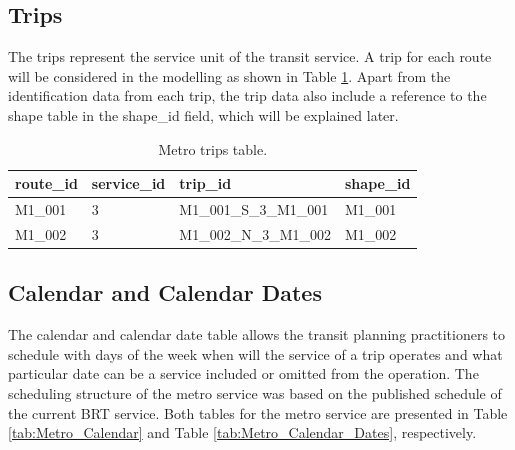 \documentclass[12pt, a4paper]{report}
\begin{document}
\subsection{Trips}

The trips represent the service unit of the transit service. A trip for each route will be considered in the modelling as shown in Table \ref{tab:Metro_Trips}. Apart from the identification data from each trip, the trip data also include a reference to the shape table in the shape\_id field, which will be explained later.




\begin{table}[ht]
\centering
\renewcommand{\arraystretch}{1.5}
\begin{tabular}{llll}
  \hline
  route\_id & service\_id & trip\_id & shape\_id \\ 
  \hline
  M1\_001 & 3 & M1\_001\_S\_3\_M1\_001 & M1\_001 \\ M1\_002 & 3 & M1\_002\_N\_3\_M1\_002 & M1\_002 \\ 
   \hline
\end{tabular}%
\caption{Metro trips table.}
\label{tab:Metro_Trips}
\end{table}

\subsection{Calendar and Calendar Dates}

The calendar and calendar date table allows the transit planning practitioners to schedule with days of the week when will the service of a trip operates and what particular date can be a service included or omitted from the operation. The scheduling structure of the metro service was based on the published schedule of the current BRT service. Both tables for the metro service are presented in Table \ref{tab:Metro_Calendar} and Table \ref{tab:Metro_Calendar_Dates}, respectively.
\end{document}
